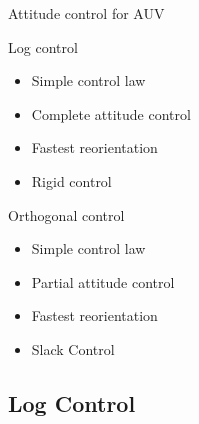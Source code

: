 \documentclass[10pt, xcolor={usenames, dvipsnames}]{beamer}
\begin{document}
        \begin{frame}{Attitude control for AUV}
            \begin{minipage}[c]{0.48\textwidth}
                \begin{block}{Log control}
                    \begin{itemize}
                        \vspace{0.25cm}
                        \item<2-> Simple control law
                        \item<3-> Complete attitude control
                        \item<4-> Fastest reorientation
                        \item<5-> Rigid control
                    \end{itemize}
                \end{block}
            \end{minipage}
            \hfill
            \begin{minipage}[c]{0.48\textwidth}
                \begin{block}{Orthogonal control}
                    \begin{itemize}
                        \vspace{0.25cm}
                        \item<2-> Simple control law
                        \item<3-> Partial attitude control
                        \item<4-> Fastest reorientation
                        \item<5-> Slack Control
                    \end{itemize}
                \end{block}
            \end{minipage}
        \end{frame}

        \subsection{Log Control}
\end{document}
